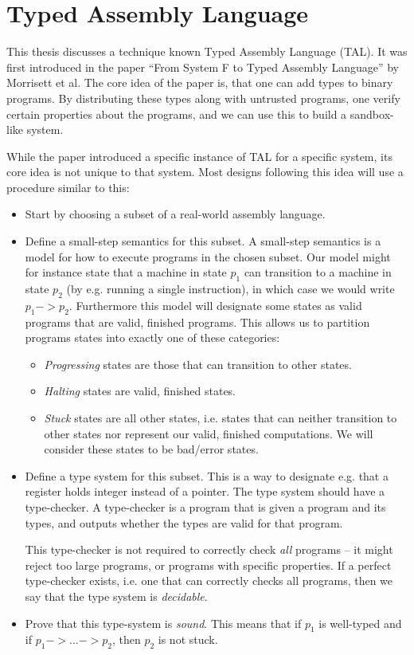 \section{Typed Assembly Language}

This thesis discusses a technique known Typed Assembly Language (TAL). It was
first introduced in the paper ``From System F to Typed Assembly Language'' by
Morrisett et al. The core idea of the paper is, that one can add types to binary
programs. By distributing these types along with untrusted programs, one verify
certain properties about the programs, and we can use this to build a
sandbox-like system.

While the paper introduced a specific instance of TAL for a specific system, its
core idea is not unique to that system. Most designs following this idea will
use a procedure similar to this:

\begin{itemize}
\item Start by choosing a subset of a real-world assembly language.

\item Define a small-step semantics for this subset. A small-step semantics is a
  model for how to execute programs in the chosen subset. Our model might for
  instance state that a machine in state $p_1$ can transition to a machine in
  state $p_2$ (by e.g. running a single instruction), in which case we would
  write $p_1 -> p_2$. Furthermore this model will designate some states as valid
  programs that are valid, finished programs. This allows us to partition
  programs states into exactly one of these categories:

  \begin{itemize}
  \item \emph{Progressing} states are those that can transition to other states.
  \item \emph{Halting} states are valid, finished states.
  \item \emph{Stuck} states are all other states, i.e. states that can neither
    transition to other states nor represent our valid, finished
    computations. We will consider these states to be bad/error states.
  \end{itemize}

\item Define a type system for this subset. This is a way to designate e.g. that
  a register holds integer instead of a pointer. The type system should have a
  type-checker. A type-checker is a program that is given a program and its
  types, and outputs whether the types are valid for that program.

  This type-checker is not required to correctly check \emph{all} programs -- it
  might reject too large programs, or programs with specific properties. If a
  perfect type-checker exists, i.e. one that can correctly checks all programs,
  then we say that the type system is \emph{decidable}.

\item Prove that this type-system is \emph{sound}. This means that if $p_1$ is
  well-typed and if $p_1 -> \dots -> p_2$, then $p_2$ is not stuck.
\end{itemize}

